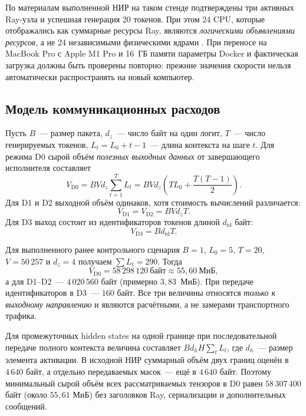 По материалам выполненной НИР на таком стенде подтверждены три активных Ray-узла и успешная генерация 20 токенов. При этом 24 CPU, которые отображались как суммарные ресурсы Ray, являются \emph{логическими объявлениями ресурсов}, а не 24 независимыми физическими ядрами \cite{rayresources}. При переносе на MacBook Pro с Apple M1 Pro и 16~ГБ памяти параметры Docker и фактическая загрузка должны быть проверены повторно: прежние значения скорости нельзя автоматически распространять на новый компьютер.

\subsection{Модель коммуникационных расходов}

Пусть $B$~--- размер пакета, $d_z$~--- число байт на один логит, $T$~--- число генерируемых токенов, $L_t=L_0+t-1$~--- длина контекста на шаге $t$. Для режима D0 сырой объём \emph{полезных выходных данных} от завершающего исполнителя составляет
\begin{equation}
 V_{\mathrm{D0}} = B V d_z\sum_{t=1}^{T}L_t
 = BVd_z\left(TL_0+\frac{T(T-1)}{2}\right).
 \label{eq:full}
\end{equation}
Для D1 и D2 выходной объём одинаков, хотя стоимость вычислений различается:
\begin{equation}
 V_{\mathrm{D1}}=V_{\mathrm{D2}}=B V d_z T.
 \label{eq:last}
\end{equation}
Для D3 выход состоит из идентификаторов токенов длиной $d_{\mathrm{id}}$ байт:
\begin{equation}
 V_{\mathrm{D3}}=B d_{\mathrm{id}} T.
 \label{eq:id}
\end{equation}

Для выполненного ранее контрольного сценария $B=1$, $L_0=5$, $T=20$, $V=50\,257$ и $d_z=4$ получаем $\sum L_t=290$. Тогда
\begin{equation}
 V_{\mathrm{D0}}=58\,298\,120\ \text{байт}\approx55{,}60\ \text{МиБ},
 \label{eq:example}
\end{equation}
а для D1--D2~--- $4\,020\,560$ байт (примерно $3{,}83$~МиБ). При передаче идентификаторов  в D3~--- $160$ байт. Все три величины относятся \emph{только к выходному направлению} и являются расчётными, а не замерами транспортного трафика.

Для промежуточных hidden states на одной границе при последовательной передаче полного контекста величина составляет $Bd_hH\sum_t L_t$, где $d_h$~--- размер элемента активации. В исходной НИР суммарный объём двух границ оценён в $4\,640$ байт, а отдельно передаваемых масок~--- ещё в $4\,640$ байт. Поэтому минимальный сырой объём всех рассматриваемых тензоров в D0 равен $58\,307\,400$ байт (около $55{,}61$ МиБ) без заголовков Ray, сериализации и дополнительных сообщений.


